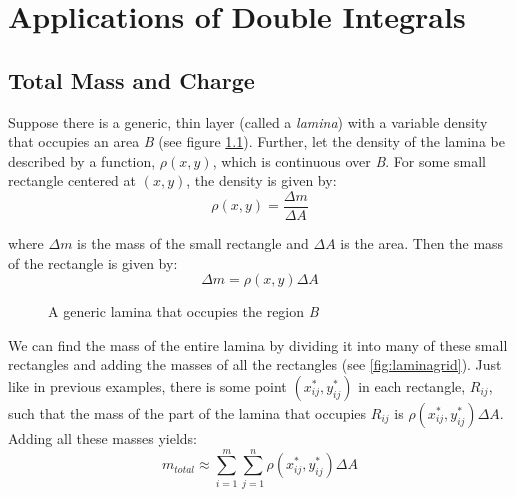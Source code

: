 \chapter{Applications of Double Integrals}

\section{Total Mass and Charge}
Suppose there is a generic, thin layer (called a \textit{lamina}) with a 
variable density that occupies an area \textit{B} (see figure \ref{fig:lamina}).
Further, let the density of the lamina be described by a function, $\rho 
(x, y)$, which is continuous over \textit{B}. For some small rectangle centered
at $(x, y)$, the density is given by:
$$\rho (x, y) = \frac{\Delta m}{\Delta A}$$

where $\Delta m$ is the mass of the small rectangle and $\Delta A$ is the area.
Then the mass of the rectangle is given by:
$$\Delta m = \rho (x, y) \Delta A$$

\begin{figure}[htbp]
\centering
    \caption{A generic lamina that occupies the region \textit{B}}
    \label{fig:lamina}
\end{figure}

We can find the mass of the entire lamina by dividing it into many of these 
small rectangles and adding the masses of all the rectangles (see 
\ref{fig:laminagrid}). Just like in previous examples, there is some point 
$(x_{ij}^*, y_{ij}^*)$ in each rectangle, $R_{ij}$, such that the mass of the 
part of the lamina that occupies $R_{ij}$ is $\rho (x_{ij}^*, y_{ij}^*) \Delta 
A$. Adding all these masses yields:
$$m_{total} \approx \sum_{i = 1}^m \sum_{j = 1}^n \rho (x_{ij}^*, y_{ij}^*) 
\Delta A$$

